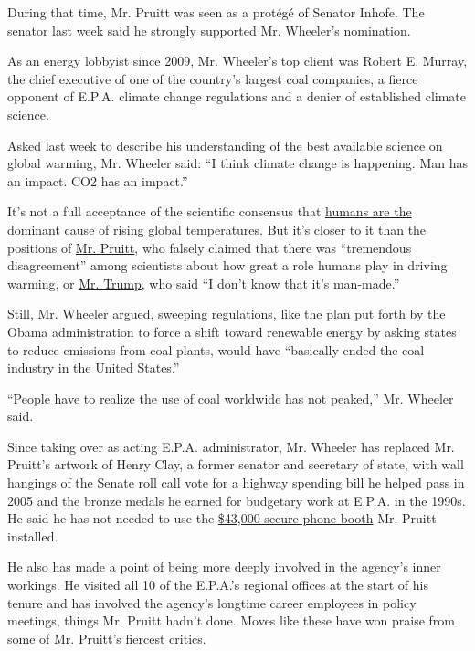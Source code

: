 During that time, Mr. Pruitt was seen as a protégé of Senator Inhofe.
The senator last week said he strongly supported Mr. Wheeler's
nomination.

As an energy lobbyist since 2009, Mr. Wheeler's top client was Robert E.
Murray, the chief executive of one of the country's largest coal
companies, a fierce opponent of E.P.A. climate change regulations and a
denier of established climate science.

Asked last week to describe his understanding of the best available
science on global warming, Mr. Wheeler said: ``I think climate change is
happening. Man has an impact. CO2 has an impact.''

It's not a full acceptance of the scientific consensus that
\href{https://www.nytimes.com/2017/11/03/climate/us-climate-report.html}{humans
are the dominant cause of rising global temperatures}. But it's closer
to it than the positions of
\href{https://www.nytimes.com/2018/02/08/climate/pruitt-climate-change.html}{Mr.
Pruitt}, who falsely claimed that there was ``tremendous disagreement''
among scientists about how great a role humans play in driving warming,
or
\href{https://www.nytimes.com/2018/10/15/climate/trump-climate-change-fact-check.html}{Mr.
Trump}, who said ``I don't know that it's man-made.''

Still, Mr. Wheeler argued, sweeping regulations, like the plan put forth
by the Obama administration to force a shift toward renewable energy by
asking states to reduce emissions from coal plants, would have
``basically ended the coal industry in the United States.''

``People have to realize the use of coal worldwide has not peaked,'' Mr.
Wheeler said.

Since taking over as acting E.P.A. administrator, Mr. Wheeler has
replaced Mr. Pruitt's artwork of Henry Clay, a former senator and
secretary of state, with wall hangings of the Senate roll call vote for
a highway spending bill he helped pass in 2005 and the bronze medals he
earned for budgetary work at E.P.A. in the 1990s. He said he has not
needed to use the
\href{https://www.nytimes.com/2018/04/16/climate/scott-pruitt-phone-booth.html}{\$43,000
secure phone booth} Mr. Pruitt installed.

He also has made a point of being more deeply involved in the agency's
inner workings. He visited all 10 of the E.P.A.'s regional offices at
the start of his tenure and has involved the agency's longtime career
employees in policy meetings, things Mr. Pruitt hadn't done. Moves like
these have won praise from some of Mr. Pruitt's fiercest critics.

